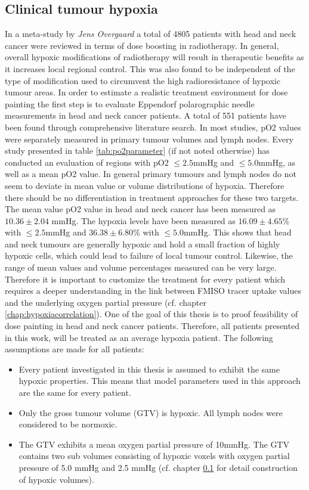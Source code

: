 \subsection{Clinical tumour hypoxia}\label{chap:tumourhypoxia}
In a meta-study by \textit{Jens Overgaard} \cite{pmid21511351} a total of 4805 patients with head and neck cancer were reviewed in terms of dose boosting in radiotherapy. In general, overall hypoxic modifications of radiotherapy will result in therapeutic benefits as it increases local regional control. This was also found to be independent of the type of modification used to circumvent the high radioresistance of hypoxic tumour areas. In order to estimate a realistic treatment environment for dose painting the first step is to evaluate Eppendorf polarographic needle measurements in head and neck cancer patients. A total of 551 patients have been found through comprehensive literature search. In most studies, pO2 values were separately measured in primary tumour volumes and lymph nodes. Every study presented in table \ref{tab:po2parameter} (if not noted otherwise) has conducted an evaluation of regions with pO2 $\leq 2.5$mmHg and $\leq 5.0$mmHg, as well as a mean pO2 value. In general primary tumours and lymph nodes do not seem to deviate in mean value or volume distributions of hypoxia. Therefore there should be no differentiation in treatment approaches for these two targets. The mean value pO2 value in head and neck cancer has been measured as $10.36 \pm 2.04$ mmHg. The hypoxia levels have been measured as $16.09 \pm 4.65$\% with $\leq 2.5$mmHg and  $36.38 \pm 6.80$\% with $\leq 5.0$mmHg. This shows that head and neck tumours are generally hypoxic and hold a small fraction of highly hypoxic cells, which could lead to failure of local tumour control. Likewise, the range of mean values and volume percentages measured can be very large. Therefore it is important to customize the treatment for every patient which requires a deeper understanding in the link between FMISO tracer uptake values and the underlying oxygen partial pressure (cf. chapter \ref{chap:hypoxiacorrelation}). One of the goal of this thesis is to proof feasibility of dose painting in head and neck cancer patients. Therefore, all patients presented in this work, will be treated as an average hypoxia patient. The following assumptions are made for all patients:
\begin{itemize}
\item Every patient investigated in this thesis is assumed to exhibit the same hypoxic properties. This means that model parameters used in this approach are the same for every patient.
\item Only the gross tumour volume (GTV) is hypoxic. All lymph nodes were considered to be normoxic.
\item The GTV exhibits a mean oxygen partial pressure of 10mmHg. The GTV contains two sub volumes consisting of hypoxic voxels with oxygen partial pressure of 5.0 mmHg and 2.5 mmHg (cf. chapter \ref{chap:tumourhypoxia} for detail construction of hypoxic volumes).
\end{itemize}
